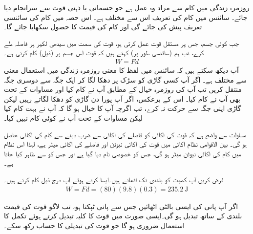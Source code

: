 

روزمرہ زندگی میں کام سے مراد وہ عمل ہے جو جسمانی یا ذہنی قوت سے سرانجام دیا جائے۔ سائنس میں کام کی تعریف اس سے مختلف ہے۔ اس حصہ میں کام کی سائنسی  تعریف پیش کی جائے گی اور کام کی قیمت کا حصول سکھایا جائے گا۔

جب کوئی جسم،  جس پر مستقل قوت  عمل کرتی ہو، قوت کی سمت میں سیدھی لکیر پر فاصلہ   طے  کرے، تب ہم (سائنسی طور پر) کہتے ہیں کہ قوت  اس جسم پر  (ذیل) کام  کرتی ہے۔
\begin{align}\label{مساوات_تکمل_استعمال_کام_مستقل_قوت}
W=Fd
\end{align}
آپ دیکھ سکتے ہیں کہ سائنس میں لفظ  کا معنی روزمرہ زندگی میں استعمال معنی سے مختلف ہے۔ اگر آپ کسی گاڑی کو سڑک پر دھکا لگا کر ایک جگہ سے دوسری جگہ منتقل کریں تب آپ کی روزمرہ خیال کے مطابق آپ نے کام کیا اور مساوات  کے تحت بھی آپ نے کام کیا۔ اس کے برعکس، اگر آپ پورا دن گاڑی کو دھکا لگاتے رہیں لیکن گاڑی اپنی جگہ سے حرکت نہ کرے، تب اگرچہ آپ کا خیال ہو گا کہ آپ نے بہت کام کیا لیکن مساوات  کے تحت آپ نے کوئی کام نہیں کیا۔

مساوات  سے واضح ہے کہ قوت کی اکائی کو فاصلے  کی اکائی سے ضرب دینے سے کام کی اکائی حاصل ہو گی۔ بین الاقوامی نظام اکائی میں قوت کی اکائی نیوٹن  اور فاصلے کی اکائی میٹر  ہے،  لہٰذا اس نظام میں کام کی اکائی نیوٹن میٹر   ہو گی،  جس کو خصوصی نام  دیا گیا ہے اور جس کو  سے ظاہر کیا جاتا ہے۔

فرض کریں  آپ   کمیت کو  بلندی تک اٹھاتے ہیں۔ایسا کرتے ہوئے آپ درج ذیل کام کرتے ہیں۔
\begin{align*}
W=Fd=(80)(9.8)(0.3)=\SI{235.2}{\joule}
\end{align*}

اگر آپ پانی کی ایسی بالٹی  اٹھائیں جس سے پانی ٹپکتا ہو،  تب لاگو قوت کی قیمت بلندی کے ساتھ تبدیل ہو گی۔ایسی صورت میں قوت کا کلیہ  تبدیل کرتے ہوئے تکمل کا استعمال ضروری ہو گا جو قوت  کی تبدیلی کا حساب رکھ سکے۔ 

